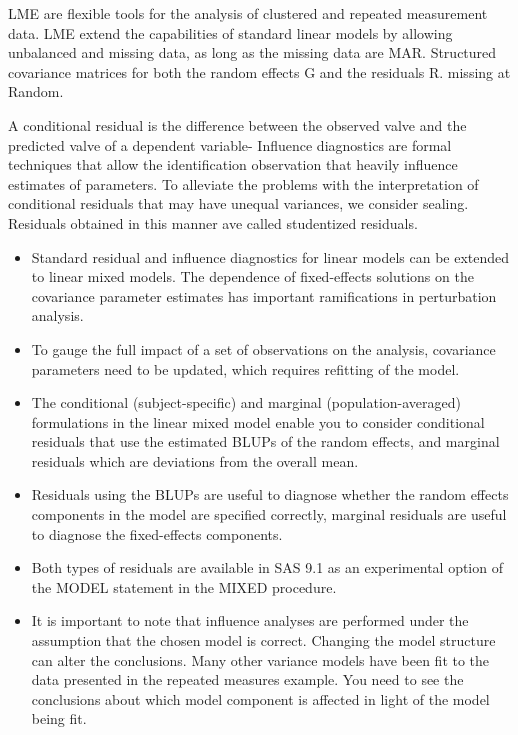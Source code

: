\documentclass[12pt, a4paper]{report}
\theoremstyle{plain}
\theoremstyle{definition}
\theoremstyle{remark}
\begin{document}
LME are flexible tools for the analysis of clustered and repeated measurement data. LME extend the capabilities of standard linear models by allowing unbalanced and missing data, as long as the missing data are MAR. Structured covariance matrices for both the random effects G and the residuals R. missing at Random.

A conditional residual is the difference between the observed valve and the predicted valve of a dependent variable- Influence diagnostics are formal techniques that allow the identification observation that heavily influence estimates of parameters.
To alleviate the problems with the interpretation of conditional residuals that may have unequal variances, we consider sealing.
Residuals obtained in this manner ave called studentized residuals.

\begin{itemize}
	\item Standard residual and inﬂuence diagnostics for linear models can be extended to linear mixed models. The dependence of ﬁxed-effects solutions on the covariance parameter estimates has important ramiﬁcations in perturbation analysis. 
	\item To gauge the full impact of a set of observations on the analysis, covariance parameters need to be updated, which requires reﬁtting of the model. 
	
	\item The conditional (subject-speciﬁc) and marginal (population-averaged) formulations in the linear mixed model enable you to consider conditional residuals that use the estimated BLUPs of the random effects, and marginal residuals which are deviations from the overall mean. 
	\item Residuals using the BLUPs are useful to diagnose whether the random effects components in the model are speciﬁed correctly, marginal residuals are useful to diagnose the ﬁxed-effects components. 
	\item Both types of residuals are available in SAS 9.1 as an experimental option of the MODEL statement in the MIXED procedure.
	
	\item It is important to note that influence analyses are performed under the assumption that the chosen model is correct. Changing the model structure can alter the conclusions. Many other variance models have been ﬁt to the data presented in the repeated measures example. You need to see the conclusions about which model component is affected in light of the model being fit.
\end{itemize}
\end{document}
